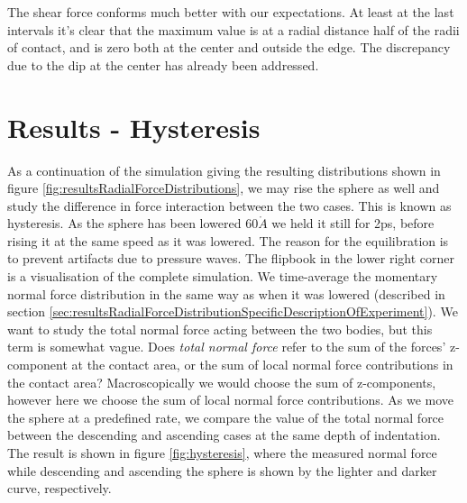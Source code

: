 \documentclass[twoside,english]{uiofysmaster}
\begin{document}
 The shear force conforms much better with our expectations.
 At least at the last intervals it's clear that the maximum value is at a radial distance half of the radii of contact, and is zero both at the center and outside the edge. 
 The discrepancy due to the dip at the center has already been addressed. 
 
 


\section{Results - Hysteresis}
As a continuation of the simulation giving the resulting distributions shown in figure \ref{fig:resultsRadialForceDistributions}, we may rise the sphere as well and study the difference in force interaction between the two cases. 
This is known as hysteresis.
As the sphere has been lowered $60\mathring{A}$ we held it still for 2ps, before rising it at the same speed as it was lowered. 
The reason for the equilibration is to prevent artifacts due to pressure waves. 
The flipbook in the lower right corner is a visualisation of the complete simulation. 
We time-average the momentary normal force distribution in the same way as when it was lowered (described in section \ref{sec:resultsRadialForceDistributionSpecificDescriptionOfExperiment}).
We want to study the total normal force acting between the two bodies, but this term is somewhat vague. 
Does \textit{total normal force} refer to the sum of the forces' z-component at the contact area, or the sum of local normal force contributions in the contact area? 
Macroscopically we would choose the sum of z-components, however here we choose the sum of local normal force contributions.
As we move the sphere at a predefined rate, we compare the value of the total normal force between the descending and ascending cases at the same depth of indentation.  
The result is shown in figure \ref{fig:hysteresis}, where the measured normal force while descending and ascending the sphere is shown by the lighter and darker curve, respectively. 
\end{document}
